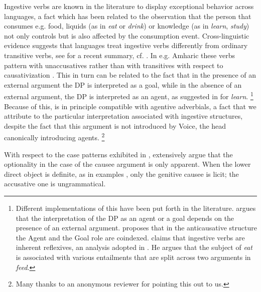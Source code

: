 \documentclass[output=paper]{langscibook}
\begin{document}
Ingestive verbs are known in the literature to display exceptional behavior across languages, 
a fact which has been related to the observation that the person 
that consumes e.g. food, liquids (as in \textit{eat} or \textit{drink}) or knowledge (as in \textit{learn}, \textit{study})
not only controls but is also affected by the consumption event. 
Cross-linguistic evidence suggests that languages treat ingestive verbs differently from ordinary transitive verbs, 
see \citet{Jerro2019} for a recent summary, cf. \citet{Amberber1996,Jackendoff1990}. 
In e.g. Amharic these verbs pattern with unaccusatives rather than with transitives with respect to causativization \citep{Amberber1996}. 
This in turn can be related to the fact that in the presence of an external argument the DP is interpreted as a goal, 
while in the absence of an external argument, the DP is interpreted as an agent, as suggested in \citet{Anagnostopoulou2001} for \textit{learn}.%
\footnote{
    Different implementations of this have been put forth in the literature. 
    \citet{Anagnostopoulou2001} argues that the interpretation of the DP as an agent or a goal depends on the presence of an external argument. 
    \citet{Amberber1996} proposes that in the anticausative structure the Agent and the Goal role are coindexed. 
    \citet{Krejci2012} claims that ingestive verbs are inherent reflexives, an analysis adopted in \citet{Jerro2019}. 
    He argues that the subject of \textit{eat} is associated with various entailments that are split across two arguments in \textit{feed}.
}
Because of this,  is in principle compatible with agentive adverbials, 
a fact that we attribute to the particular interpretation associated with ingestive structures, 
despite the fact that this argument is not introduced by Voice, the head canonically introducing agents.%
\footnote{
    Many thanks to an anonymous reviewer for pointing this out to us.
}

With respect to the case patterns exhibited in , 
\citet{AnagnostopoulouSevdali2020} extensively argue that the optionality in the case of the causee argument is only apparent. 
When the lower direct object is definite, as in examples , only the genitive causee is licit; 
the accusative one is ungrammatical. 

\ea
    \label{alexiadouex:key:10}
    \z 
\z
\end{document}
